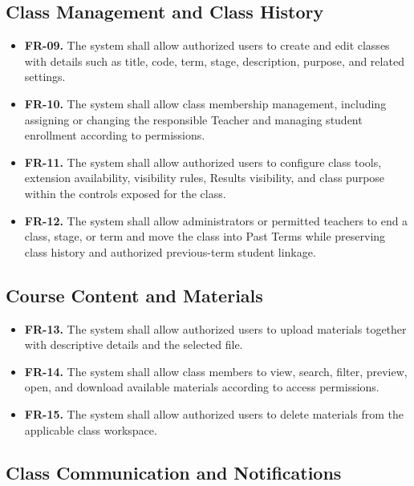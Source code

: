 \subsection*{Class Management and Class History}

\begin{itemize}
  \item \textbf{FR-09.} The system shall allow authorized users to create and
    edit classes with details such as title, code, term, stage, description,
    purpose, and related settings.
  \item \textbf{FR-10.} The system shall allow class membership management,
    including assigning or changing the responsible Teacher and managing
    student enrollment according to permissions.
  \item \textbf{FR-11.} The system shall allow authorized users to configure
    class tools, extension availability, visibility rules, Results visibility,
    and class purpose within the controls exposed for the class.
  \item \textbf{FR-12.} The system shall allow administrators or permitted
    teachers to end a class, stage, or term and move the class into Past
    Terms while preserving class history and authorized previous-term student
    linkage.
\end{itemize}

\subsection*{Course Content and Materials}

\begin{itemize}
  \item \textbf{FR-13.} The system shall allow authorized users to upload
    materials together with descriptive details and the selected file.
  \item \textbf{FR-14.} The system shall allow class members to view, search,
    filter, preview, open, and download available materials according to
    access permissions.
  \item \textbf{FR-15.} The system shall allow authorized users to delete
    materials from the applicable class workspace.
\end{itemize}

\subsection*{Class Communication and Notifications}

